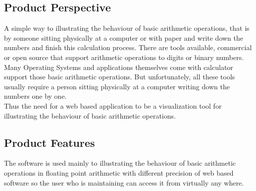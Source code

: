 \documentclass[11pt]{article}
\begin{document}

\subsection{Product Perspective}%
A simple way to illustrating the behaviour of basic arithmetic operations, that is by someone sitting physically at a computer or with paper and write down the numbers and finish this calculation process. There are tools available, commercial or open source that support arithmetic operations to digits or binary numbers. Many Operating Systems and applications themselves come with calculator support those basic arithmetic operations. But unfortunately, all these tools usually require a person sitting physically at a computer writing down the numbers one by one.\\

Thus the need for a web based application to be a visualization tool for illustrating the behaviour of basic arithmetic operations.

\subsection{Product Features}%
The software is used mainly to illustrating the behaviour of basic arithmetic operations in floating point arithmetic with different precision of web based software so the user who is maintaining can access it from virtually any where.\\
\end{document}

